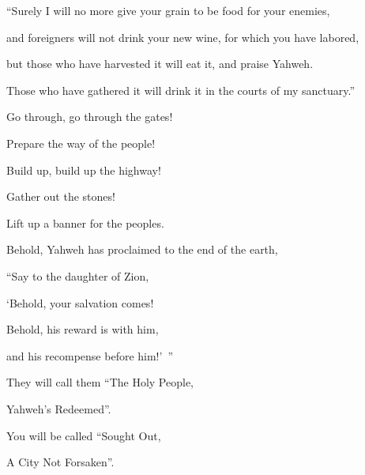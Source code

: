 {\par }{\Q “Surely I will no more give your grain to be food for your enemies,
\par }{\QB and foreigners will not drink your new wine, for which you have labored,
\par }{\Q {}but those who have harvested it will eat it, and praise Yahweh.
\par }{\QB Those who have gathered it will drink it in the courts of my sanctuary.”
\par }{\BB \par }{\Q {}Go through, go through the gates!
\par }{\QB Prepare the way of the people!
\par }{\Q Build up, build up the highway!
\par }{\QB Gather out the stones!
\par }{\QB Lift up a banner for the peoples.
\par }{\Q {}Behold, Yahweh has proclaimed to the end of the earth,
\par }{\QB “Say to the daughter of Zion,
\par }{\QB ‘Behold, your salvation comes!
\par }{\Q Behold, his reward is with him,
\par }{\QB and his recompense before him!’ ”
\par }{\Q {}They will call them “The Holy People,
\par }{\QB Yahweh’s Redeemed”.
\par }{\Q You will be called “Sought Out,
\par }{\QB A City Not Forsaken”.

}
